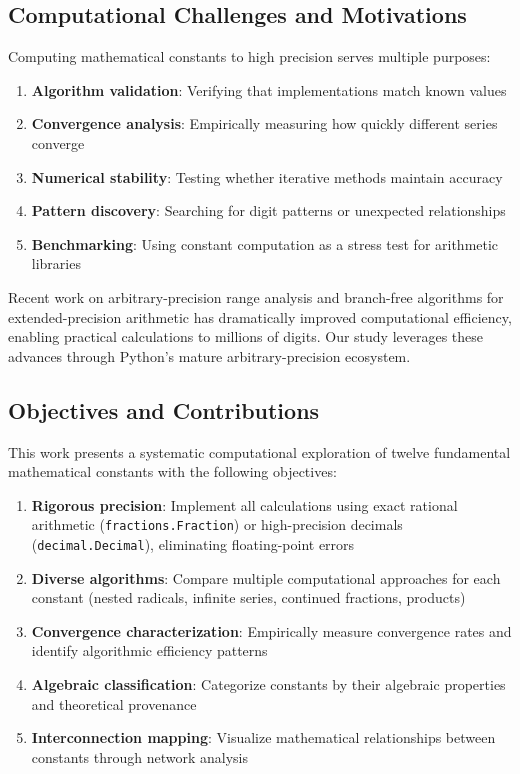 \documentclass[11pt,a4paper]{article}
\begin{document}
\subsection{Computational Challenges and Motivations}

Computing mathematical constants to high precision serves multiple purposes:
\begin{enumerate}
    \item \textbf{Algorithm validation}: Verifying that implementations match known values
    \item \textbf{Convergence analysis}: Empirically measuring how quickly different series converge
    \item \textbf{Numerical stability}: Testing whether iterative methods maintain accuracy
    \item \textbf{Pattern discovery}: Searching for digit patterns or unexpected relationships
    \item \textbf{Benchmarking}: Using constant computation as a stress test for arithmetic libraries
\end{enumerate}

Recent work on arbitrary-precision range analysis \citep{arpra2021} and branch-free algorithms for extended-precision arithmetic \citep{branchfree2025} has dramatically improved computational efficiency, enabling practical calculations to millions of digits. Our study leverages these advances through Python's mature arbitrary-precision ecosystem.

\subsection{Objectives and Contributions}

This work presents a systematic computational exploration of twelve fundamental mathematical constants with the following objectives:

\begin{enumerate}
    \item \textbf{Rigorous precision}: Implement all calculations using exact rational arithmetic (\texttt{fractions.Fraction}) or high-precision decimals (\texttt{decimal.Decimal}), eliminating floating-point errors
    \item \textbf{Diverse algorithms}: Compare multiple computational approaches for each constant (nested radicals, infinite series, continued fractions, products)
    \item \textbf{Convergence characterization}: Empirically measure convergence rates and identify algorithmic efficiency patterns
    \item \textbf{Algebraic classification}: Categorize constants by their algebraic properties and theoretical provenance
    \item \textbf{Interconnection mapping}: Visualize mathematical relationships between constants through network analysis
\end{enumerate}
\end{document}

